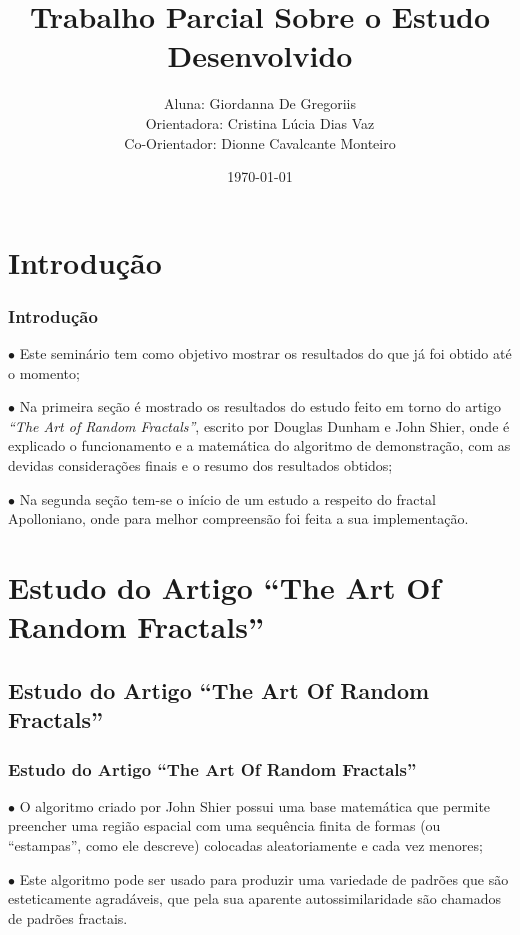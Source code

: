 \documentclass[aspectratio=169,11pt,red]{beamer}
\author[\sc{GREGORIIS, G.}]{Aluna: Giordanna De Gregoriis\\Orientadora: Cristina Lúcia Dias Vaz\\Co-Orientador: Dionne Cavalcante Monteiro}
\institute[\sc{UFPA}]{Universidade Federal do Pará\\Instituto de Ciências Exatas e Naturais\\Faculdade de Computação\\Bacharelado em Ciência da Computação}
\date{\today}
\title{Trabalho Parcial Sobre o Estudo Desenvolvido}
\begin{document}
\begin{frame}
\titlepage
\end{frame}

\begin{frame}
\begin{multicols}{2}
{\tableofcontents}
\end{multicols}
\end{frame}

\section{Introdução}
\begin{frame}
\frametitle{Introdução}

$\bullet$ Este seminário tem como objetivo mostrar os resultados do que já foi obtido até o momento;
\medskip
\pause

$\bullet$ Na primeira seção é mostrado os resultados do estudo feito em torno do artigo {\it ``The Art of Random Fractals''}, escrito por Douglas Dunham e John Shier, onde é explicado o funcionamento e a matemática do algoritmo de demonstração, com as devidas considerações finais e o resumo dos resultados obtidos;
\medskip
\pause

$\bullet$ Na segunda seção tem-se o início de um estudo a respeito do fractal Apolloniano, onde para melhor compreensão foi feita a sua implementação.
\medskip

\end{frame}

\section{Estudo do Artigo ``The Art Of Random Fractals''}
\subsection{Estudo do Artigo ``The Art Of Random Fractals''}
\begin{frame}
\frametitle{Estudo do Artigo ``The Art Of Random Fractals''}

$\bullet$ O algoritmo criado por John Shier possui uma base matemática que permite preencher uma região espacial com uma sequência finita de formas (ou ``estampas'', como ele descreve) colocadas aleatoriamente e cada vez menores;
\medskip
\pause

$\bullet$ Este algoritmo pode ser usado para produzir uma variedade de padrões que são esteticamente agradáveis, que pela sua aparente autossimilaridade são chamados de padrões fractais.
\medskip

\end{frame}
\end{document}
